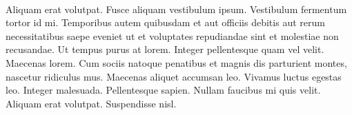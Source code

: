 \documentclass[12pt, a4paper]{article}
\begin{document}
	\newpage
	\paragraph{} Aliquam erat volutpat. Fusce aliquam vestibulum ipsum. Vestibulum fermentum tortor id mi. Temporibus autem quibusdam et aut officiis debitis aut rerum necessitatibus saepe eveniet ut et voluptates repudiandae sint et molestiae non recusandae. Ut tempus purus at lorem. Integer pellentesque quam vel velit. Maecenas lorem. Cum sociis natoque penatibus et magnis dis parturient montes, nascetur ridiculus mus. Maecenas aliquet accumsan leo. Vivamus luctus egestas leo. Integer malesuada. Pellentesque sapien. Nullam faucibus mi quis velit. Aliquam erat volutpat. Suspendisse nisl.
\end{document}
